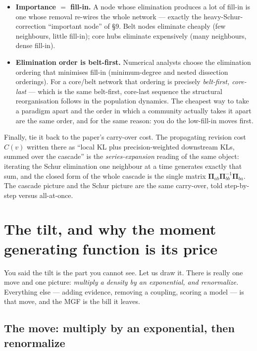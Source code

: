 \documentclass[11pt]{article}
\newcommand{\Prec}{\bm{\Pi}}        %
\theoremstyle{definition}
\begin{document}
\begin{itemize}
\item \textbf{Importance $=$ fill-in.} A node whose elimination produces a
lot of fill-in is one whose removal re-wires the whole network --- exactly
the heavy-Schur-correction ``important node'' of \S9. Belt nodes eliminate
cheaply (few neighbours, little fill-in); core hubs eliminate expensively
(many neighbours, dense fill-in).
\item \textbf{Elimination order is belt-first.} Numerical analysts choose
the elimination ordering that minimises fill-in (minimum-degree and nested
dissection orderings). For a core/belt network that ordering is precisely
\emph{belt-first, core-last} --- which is the same belt-first, core-last
sequence the structural reorganisation follows in the population dynamics.
The cheapest way to take a paradigm apart and the order in which a
community actually takes it apart are the same order, and for the same
reason: you do the low-fill-in moves first.
\end{itemize}

\noindent Finally, tie it back to the paper's carry-over cost. The
propagating revision cost $C(v)$ written there as ``local KL plus
precision-weighted downstream KLs, summed over the cascade'' is the
\emph{series-expansion} reading of the same object: iterating the Schur
elimination one neighbour at a time generates exactly that sum, and the
closed form of the whole cascade is the single matrix
$\Prec_{ab}\Prec_{bb}^{-1}\Prec_{ba}$. The cascade picture and the Schur
picture are the same carry-over, told step-by-step versus all-at-once.

\section{The tilt, and why the moment generating function is its price}
\label{app:tilt}

You said the tilt is the part you cannot see. Let us draw it. There is
really one move and one picture: \emph{multiply a density by an
exponential, and renormalize.} Everything else --- adding evidence,
removing a coupling, scoring a model --- is that move, and the MGF is the
bill it leaves.

\subsection{The move: multiply by an exponential, then renormalize}
\end{document}
